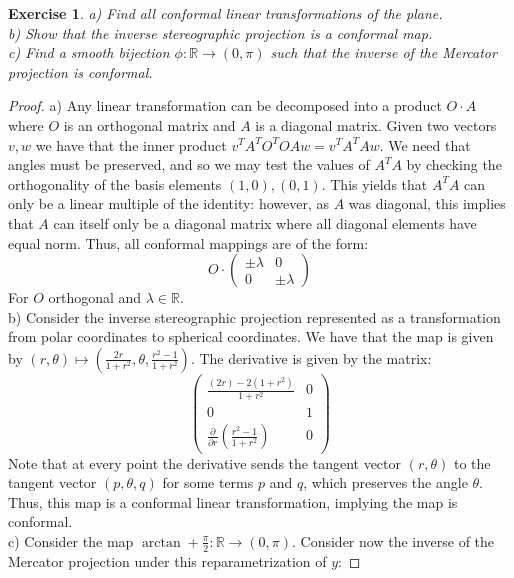 \documentclass{article}
\newcommand{\bb}[1]{\mathbb{#1}}
\newtheorem{exercise}{Exercise}
\begin{document}
   \begin{exercise}
     a) Find all conformal linear transformations of the plane. \\
     b) Show that the inverse stereographic projection is a conformal map. \\
     c) Find a smooth bijection $\phi: \bb{R} \to (0, \pi)$ such that the inverse of the Mercator projection is conformal.
   \end{exercise}
   \begin{proof}
     a) Any linear transformation can be decomposed into a product $O \cdot A$ where $O$ is an orthogonal matrix and $A$ is a diagonal matrix. Given two vectors $v,w$ we have that the inner product $v^{T}A^{T}O^{T}OAw = v^{T}A^{T}Aw$. We need that angles must be preserved, and so we may test the values of $A^{T}A$ by checking the orthogonality of the basis elements $(1,0), (0,1)$. This yields that $A^{T}A$ can only be a linear multiple of the identity: however, as $A$ was diagonal, this implies that $A$ can itself only be a diagonal matrix where all diagonal elements have equal norm. Thus, all conformal mappings are of the form:
     \[
       O \cdot
       \begin{pmatrix}
         \pm \lambda & 0 \\
         0 & \pm \lambda
       \end{pmatrix}
     \]
     For $O$ orthogonal and $\lambda \in \bb{R}$. \\
     b) Consider the inverse stereographic projection represented as a transformation from polar coordinates to spherical coordinates. We have that the map is given by $(r, \theta) \mapsto (\frac{2r}{1 +r^{2}}, \theta, \frac{r^{2}-1}{1 +r^{2}})$. The derivative is given by the matrix:
     \[
       \begin{pmatrix}
         \frac{(2r) - 2(1+r^{2})}{1+r^{2}} & 0 \\
         0 & 1 \\
         \frac{\partial}{\partial r} \left(\frac{r^{2}-1}{1 +r^{2}}\right) & 0 
       \end{pmatrix}
     \]
     Note that at every point the derivative sends the tangent vector $(r,\theta)$ to the tangent vector $(p, \theta,q)$ for some terms $p$ and $q$, which preserves the angle $\theta$. Thus, this map is a conformal linear transformation, implying the map is conformal. \\
     c) Consider the map $\arctan + \frac{\pi}{2}: \bb{R} \to (0,\pi)$. Consider now the inverse of the Mercator projection under this reparametrization of $y$:

\end{proof}
\end{document}
